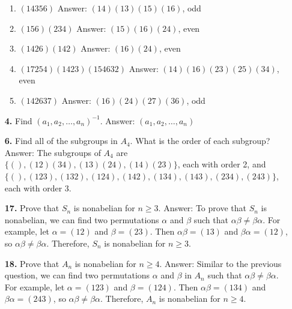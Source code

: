 \documentclass[12pt,reqno]{amsart}
\newcommand{\probskip}{\vskip1cm}
\begin{document}
\begin{enumerate}[{\bf 1.}]
\begin{multicols}{2}
\begin{enumerate}
\item
$(14356)$
Answer: $(14)(13)(15)(16)$, odd

 \item
$(156)(234)$
Answer: $(15)(16)(24)$, even
 
 \item
$(1426)(142)$
Answer: $(16)(24)$, even
 
 \item
$(17254)(1423)(154632)$
Answer: $(14)(16)(23)(25)(34)$, even
 
 \item
$(142637)$
Answer: $(16)(24)(27)(36)$, odd
 
\end{enumerate}
\end{multicols}

\probskip
 
\item[{\bf 4.}] 
Find $(a_1, a_2, \ldots, a_n)^{-1}$.
Answer: $(a_1, a_2, \ldots, a_n)$

\probskip
 
\item[{\bf 6.}] 
Find all of the subgroups in $A_4$. What is the order of each
subgroup? 
Answer: The subgroups of $A_4$ are $\{(), (12)(34), (13)(24), (14)(23)\}$, each with order 2, and $\{(), (123), (132), (124), (142), (134), (143), (234), (243)\}$, each with order 3.

\probskip

\item[{\bf 17.}] 
Prove that $S_n$ is nonabelian for $n \geq 3$.
Answer: To prove that $S_n$ is nonabelian, we can find two permutations $\alpha$ and $\beta$ such that $\alpha\beta \neq \beta\alpha$. For example, let $\alpha = (12)$ and $\beta = (23)$. Then $\alpha\beta = (13)$ and $\beta\alpha = (12)$, so $\alpha\beta \neq \beta\alpha$. Therefore, $S_n$ is nonabelian for $n \geq 3$.

\probskip
 
\item[{\bf 18.}] 
Prove that $A_n$ is nonabelian for $n \geq 4$.
Answer: Similar to the previous question, we can find two permutations $\alpha$ and $\beta$ in $A_n$ such that $\alpha\beta \neq \beta\alpha$. For example, let $\alpha = (123)$ and $\beta = (124)$. Then $\alpha\beta = (134)$ and $\beta\alpha = (243)$, so $\alpha\beta \neq \beta\alpha$. Therefore, $A_n$ is nonabelian for $n \geq 4$.


\end{enumerate}
\end{document}
